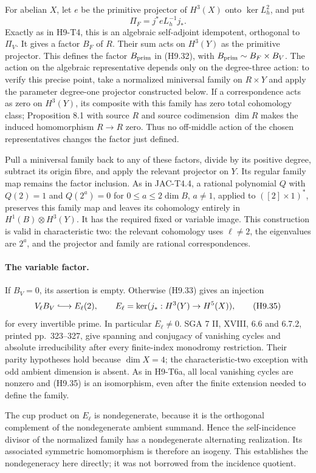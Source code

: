 \documentclass[11pt,a4paper]{article}
\begin{document}
For abelian $X$, let $e$ be the primitive projector of $H^3(X)$ onto
$\ker L_h^2$, and put
\[
 \Pi_F=j^*eL_h^{-1}j_*.
\]
Exactly as in H9-T4, this is an algebraic self-adjoint idempotent,
orthogonal to $\Pi_V$. It gives a factor $B_F$ of $R$. Their sum
acts on $H^3(Y)$ as the primitive projector. This defines the factor
$B_{\rm prim}$ in (H9.32), with
$B_{\rm prim}\sim B_F\times B_V$. The action on the algebraic
representative depends only on the degree-three action: to verify
this precise point, take a normalized miniversal family on $R\times Y$
and apply the parameter degree-one projector constructed below. If a
correspondence acts as zero on $H^3(Y)$, its composite with this family
has zero total cohomology class; Proposition 8.1 with source $R$ and
source codimension $\dim R$ makes the induced homomorphism $R\to R$
zero. Thus no off-middle action of the chosen representatives changes
the factor just defined.

Pull a miniversal family back to any of these factors, divide by its
positive degree, subtract its origin fibre, and apply the relevant
projector on $Y$. Its regular family map remains the factor inclusion.
As in JAC-T4.4, a rational polynomial $Q$ with $Q(2)=1$ and
$Q(2^a)=0$ for $0\le a\le2\dim B$, $a\ne1$, applied to
$([2]\times1)^*$, preserves this family map and leaves its cohomology
entirely in $H^1(B)\otimes H^3(Y)$. It has the required fixed or
variable image. This construction is valid in characteristic two:
the relevant cohomology uses $\ell\ne2$, the eigenvalues are $2^a$,
and the projector and family are rational correspondences.

\paragraph{The variable factor.}
If $B_V=0$, its assertion is empty. Otherwise (H9.33) gives an injection
\[
 V_\ell B_V\lhook\joinrel\longrightarrow E_\ell(2),
 \qquad E_\ell=\ker(j_*:H^3(Y)\to H^5(X)),                  \tag{H9.35}
\]
for every invertible prime. In particular $E_\ell\ne0$. SGA 7 II,
XVIII, 6.6 and 6.7.2, printed pp.~323--327, give spanning and conjugacy
of vanishing cycles and absolute irreducibility after every finite-index
monodromy restriction. Their parity hypotheses hold because $\dim X=4$;
the characteristic-two exception with odd ambient dimension is absent.
As in H9-T6a, all local vanishing cycles are nonzero and (H9.35) is an
isomorphism, even after the finite extension needed to define the family.

The cup product on $E_\ell$ is nondegenerate, because it is the
orthogonal complement of the nondegenerate ambient summand. Hence the
self-incidence divisor of the normalized family has a nondegenerate
alternating realization. Its associated symmetric homomorphism is
therefore an isogeny. This establishes the nondegeneracy here directly;
it was not borrowed from the incidence quotient.
\end{document}
